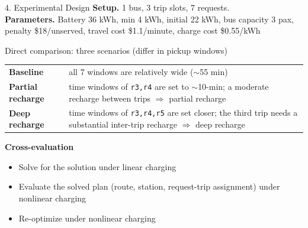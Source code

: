 \documentclass[10pt,aspectratio=169]{beamer}
\begin{document}

\begin{frame}{4. Experimental Design}
\textbf{Setup.} 1 bus, 3 trip slots, 7 requests.\\
\textbf{Parameters.} Battery 36 kWh, min 4 kWh, initial 22 kWh, bus capacity 3 pax, penalty \$18/unserved, travel cost \$1.1/minute, charge cost \$0.55/kWh  
\vspace{6pt}
\begin{block}{Direct comparison: three scenarios (differ in pickup windows)}
\begin{tabular}{@{}p{}p{}@{}}
\textbf{Baseline}       & all 7 windows are relatively wide ($\sim$55 min)\\
\textbf{Partial recharge} & time windows of \texttt{r3,r4} are set to $\sim$10-min; a moderate recharge between trips $\Rightarrow$ partial recharge \\
\textbf{Deep recharge}  & time windows of \texttt{r3,r4,r5} are set closer; the third trip needs a substantial inter-trip recharge $\Rightarrow$ deep recharge
\end{tabular}
\end{block}

\textbf{Cross-evaluation}
\begin{itemize}\itemsep1pt
  \item Solve for the solution under linear charging
  \item Evaluate the solved plan (route, station, request-trip assignment) under nonlinear charging 
  \item Re-optimize under nonlinear charging
\end{itemize}
\end{frame}
\end{document}
